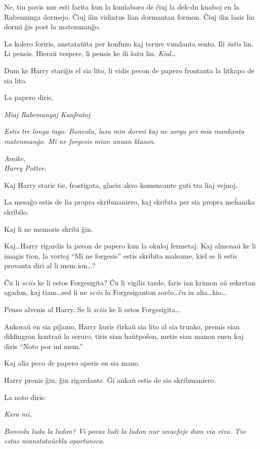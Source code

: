 Ne, tiu povis nur esti farita kun la kunlaboro de ĉiuj la dek-du
knaboj en la Rabemunga dormejo. Ĉiuj ilin vidintus lian dormantan
formon. Ĉiuj ilin lasis lin dormi ĝis post la matenmanĝo.

La kolero foriris, anstataŭita per konfuzo kaj terure vundanta sento.
Ili \emph{ŝatis} lin. Li pensis. Hieraŭ vespere, li pensis ke ili ŝatu
lin. \emph{Kial}\ldots

Dum ke Harry stariĝis el sia lito, li vidis pecon de papero frontanta
la litkapo de sia lito.

La papero diris,
\medskip

\emph{Miaj Rabemungaj Kunfratoj}

\emph{Estis tre longa tago. Bonvolu, lasu min dormi kaj ne zorgu pri
  mia mankonta matenmanĝo. Mi ne forgesis mian unuan klason.}

\emph{Amike,\\
  Harry Potter.
}
\medskip

Kaj Harry staris tie, frostigata, glacia akvo komencante guti tra liaj
vejnoj.

La mesaĝo estis de lia propra skribmaniero, kaj skribita per sia
propra meĥanika skribilo.

Kaj li ne memoris skribi ĝin.

Kaj\ldots Harry rigardis la pecon de papero kun la okuloj
fermetaj. Kaj almenaŭ ke li imagis tion, la vortoj ``Mi ne forgesis''
estis skribita malsame, kiel se li estis provanta diri al
li mem ion\ldots?

Ĉu li \emph{sciis} ke li estos Forgesigita? Ĉu li vigilis tarde, faris
ian krimon aŭ sekretan agadon, kaj tiam\ldots sed li ne \emph{sciis} la
Forgesiganton sorĉo\ldots ĉu iu alia\ldots kio\ldots

Penso alvenis al Harry. Se li \emph{sciis} ke li estos
Forgesigita\ldots

Ankoraŭ en sia piĵamo, Harry kuris ĉirkaŭ sia lito al sia trunko,
premis sian dikfingron kontraŭ la seruro, tiris sian haŭtpoŝon, metis
sian manon enen kaj diris ``Noto por mi mem.''

Kaj alia peco de papero aperis en sia mano.

Harry prenis ĝin, ĝin rigardante. Ĝi ankaŭ estis de sia skribmaniero.

La noto diris:
\medskip

\emph{Kara mi,}

\emph{Bonvolu ludu la ludon? Vi povas ludi la ludon nur unuefoje dum
  via vivo. Tio estas neanstataŭebla oportuneco.}

